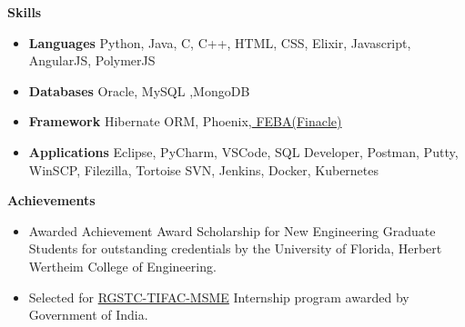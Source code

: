 \documentclass[letterpaper,12pt]{article}[leftmargin=*]
\def \entryspacing {-2pt}
\def \entryspacingnew {-4pt}
\renewcommand{\section}[2]{\vspace{5pt}
  \colorbox{secondary}{\color{white}\raggedbottom\normalsize\textbf{{#1}{\hspace{7pt}#2}}}
}
\newcommand{\resumeEntryStart}{\begin{itemize}[leftmargin=2.5mm]\vspace{\entryspacingnew}}
\newcommand{\resumeEntryEnd}{\end{itemize}\vspace{\entryspacingnew}}
\newcommand{\resumeItemListStart}{\begin{itemize}[leftmargin=4.5mm]}
\newcommand{\resumeItemListEnd}{\end{itemize}\vspace{\entryspacing}}
\newcommand{\resumeItem}[1]{
  \item\small{
    {#1 \vspace{-2pt}}
  }
}
\newcommand{\resumeEntryS}[2]{
  \item[]\small{
    \textbf{\color{primary}#1 }{ #2 \vspace{-6pt}}
  }
}
\begin{document}
  
 
   
 


\vspace{3pt}
\hspace{-15pt}\section{\faGears}{Skills}
 \resumeEntryStart
  \resumeEntryS{Languages } {Python, Java, C, C++, HTML, CSS, Elixir, Javascript, AngularJS, PolymerJS}
  \resumeEntryS{Databases } {Oracle, MySQL ,MongoDB}
  \resumeEntryS{Framework } {Hibernate ORM, Phoenix,\href{https://www.edgeverve.com/finacle/
}{ FEBA(Finacle)}}
  \resumeEntryS{Applications } {Eclipse, PyCharm, VSCode,  SQL Developer, Postman, Putty, WinSCP, Filezilla, Tortoise SVN, Jenkins, Docker, Kubernetes }
 \resumeEntryEnd
\vspace{8pt}

\hspace{-15pt}\section{\faTrophy}{Achievements}

   \resumeEntryStart
 
    \resumeItemListStart
      \resumeItem {Awarded Achievement Award Scholarship for New Engineering Graduate Students for outstanding credentials  by the University of Florida, Herbert Wertheim College of Engineering.}
      
      \resumeItem{Selected for \href{http://www.rknec.edu/IIIC/Internship.aspx}{RGSTC-TIFAC-MSME} Internship program awarded by Government of India.}
    \resumeItemListEnd
  \resumeEntryEnd
\end{document}
